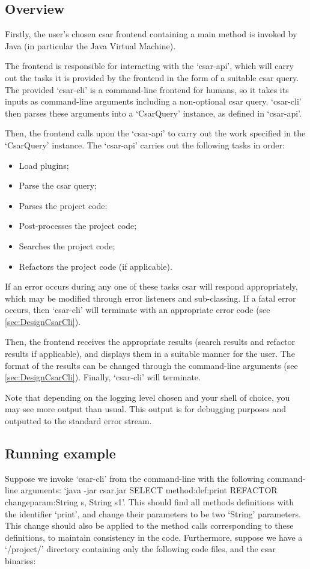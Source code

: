 \documentclass[12pt, letterpaper]{article}
\begin{document}
\subsection{Overview}
Firstly, the user's chosen csar frontend containing a main method is invoked by Java (in particular the Java Virtual Machine).

The frontend is responsible for interacting with the `csar-api', which will carry out the tasks it is provided by the frontend in the form of a suitable csar query.
The provided `csar-cli' is a command-line frontend for humans, so it takes its inputs as command-line arguments including a non-optional csar query.
`csar-cli' then parses these arguments into a `CsarQuery' instance, as defined in `csar-api'.

Then, the frontend calls upon the `csar-api' to carry out the work specified in the `CsarQuery' instance.
The `csar-api' carries out the following tasks in order:
\begin{itemize}
  \item Load plugins;
  \item Parse the csar query;
  \item Parses the project code;
  \item Post-processes the project code;
  \item Searches the project code;
  \item Refactors the project code (if applicable).
\end{itemize}
If an error occurs during any one of these tasks csar will respond appropriately, which may be modified through error listeners and sub-classing.
If a fatal error occurs, then `csar-cli' will terminate with an appropriate error code (see \ref{sec:DesignCsarCli}).

Then, the frontend receives the appropriate results (search results and refactor results if applicable), and displays them in a suitable manner for the user.
The format of the results can be changed through the command-line arguments (see \ref{sec:DesignCsarCli}).
Finally, `csar-cli' will terminate.

Note that depending on the logging level chosen and your shell of choice, you may see more output than usual.
This output is for debugging purposes and outputted to the standard error stream.

\subsection{Running example}
Suppose we invoke `csar-cli' from the command-line with the following command-line arguments: `java -jar csar.jar SELECT method:def:print REFACTOR changeparam:String s, String s1'.
This should find all methods definitions with the identifier `print', and change their parameters to be two `String' parameters.
This change should also be applied to the method calls corresponding to these definitions, to maintain consistency in the code.
Furthermore, suppose we have a `/project/' directory containing only the following code files, and the csar binaries:
\end{document}
